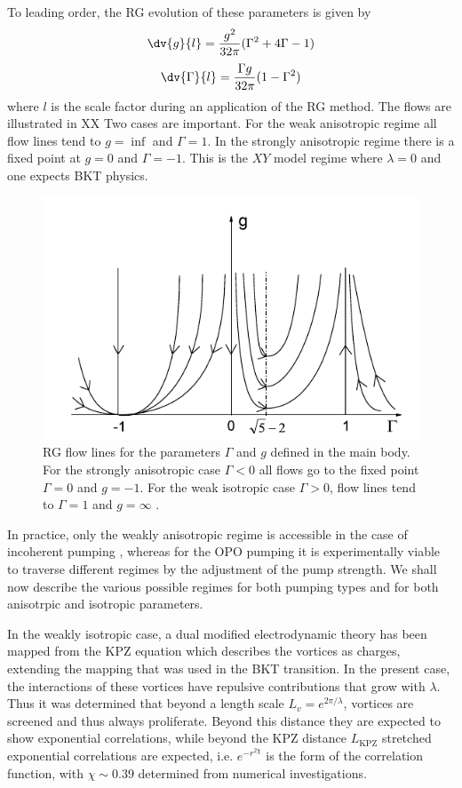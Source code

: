 To leading order, the RG evolution of these parameters is given by 
\[
\dv{g}{l} = \frac{g^2}{32\pi}(\Gamma^2 + 4\Gamma-1)
\]
\[
\dv{\Gamma}{l} = \frac{\Gamma g}{32 \pi}(1-\Gamma^2)
\]
where $l$ is the scale factor during an application of the RG method. The flows are illustrated in XX  Two cases are important. For the weak anisotropic regime all flow lines tend to $g=\inf$ and $\Gamma=1$. In the strongly anisotropic regime there is a fixed point at $g=0$ and $\Gamma=-1$. This is the $XY$ model regime where $\lambda=0$ and one expects BKT physics. 

\begin{figure}[htbp!]
	\centering
	\includegraphics[scale=0.8]{rgflows.pdf}
	\caption{RG flow lines for the parameters $\Gamma$ and $g$ defined in the main body. 
	For the strongly anisotropic case $\Gamma < 0$ all flows go to the fixed point $\Gamma =0$ and $g=-1$. 
	For the weak isotropic case $\Gamma >0$, flow lines tend to $\Gamma =1$ and $g = \infty$ \cite{PhysRevLett.111.088701}. }
	\label{fig:rgflows}

\end{figure}

In practice, only the weakly anisotropic regime is accessible in the case of incoherent pumping \cite{2015PhRvX...5a1017A}, whereas for the OPO pumping it is experimentally viable to traverse different regimes by the adjustment of the pump strength. We shall now describe the various possible regimes for both pumping types and for both anisotrpic and isotropic parameters. 

In the weakly isotropic case, a dual modified electrodynamic theory has been mapped from the KPZ equation which describes the vortices as charges, extending the mapping that was used in the BKT transition. In the present case, the interactions of these vortices have repulsive contributions that grow with $\lambda$. Thus it was determined that beyond a length scale $L_v = e^{2\pi/\lambda}$, vortices are screened and thus always proliferate. Beyond this distance they are expected to show exponential correlations, while beyond the KPZ distance $L_{\text{KPZ}}$ stretched exponential correlations are expected, i.e. $e^{-r^{2\chi}}$ is the form of the correlation function, with $\chi \sim 0.39$ determined from numerical investigations.


